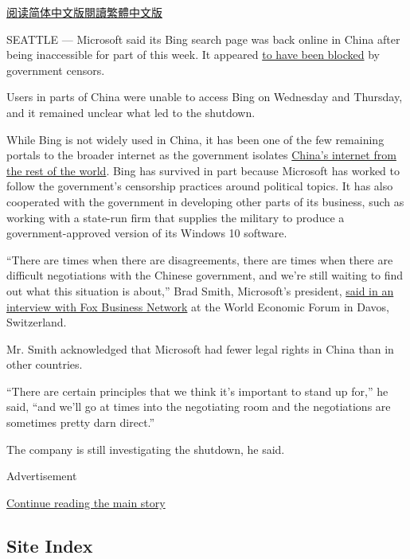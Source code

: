 \href{https://cn.nytimes.com/technology/20190125/microsoft-bing-china/}{阅读简体中文版}\href{https://cn.nytimes.com/technology/20190125/microsoft-bing-china/zh-hant/}{閱讀繁體中文版}

SEATTLE --- Microsoft said its Bing search page was back online in China
after being inaccessible for part of this week. It appeared
\href{https://www.nytimes.com/2019/01/23/business/china-microsoft-bing.html}{to
have been blocked} by government censors.

Users in parts of China were unable to access Bing on Wednesday and
Thursday, and it remained unclear what led to the shutdown.

While Bing is not widely used in China, it has been one of the few
remaining portals to the broader internet as the government isolates
\href{https://www.nytimes.com/2018/08/06/technology/china-generation-blocked-internet.html?module=inline}{China's
internet from the rest of the world}. Bing has survived in part because
Microsoft has worked to follow the government's censorship practices
around political topics. It has also cooperated with the government in
developing other parts of its business, such as working with a state-run
firm that supplies the military to produce a government-approved version
of its Windows 10 software.

``There are times when there are disagreements, there are times when
there are difficult negotiations with the Chinese government, and we're
still waiting to find out what this situation is about,'' Brad Smith,
Microsoft's president,
\href{https://video.foxbusiness.com/v/5993355739001/\#sp=show-clips}{said
in an interview with Fox Business Network} at the World Economic Forum
in Davos, Switzerland.

Mr. Smith acknowledged that Microsoft had fewer legal rights in China
than in other countries.

``There are certain principles that we think it's important to stand up
for,'' he said, ``and we'll go at times into the negotiating room and
the negotiations are sometimes pretty darn direct.''

The company is still investigating the shutdown, he said.

Advertisement

\protect\hyperlink{after-bottom}{Continue reading the main story}

\hypertarget{site-index}{%
\subsection{Site Index}\label{site-index}}

